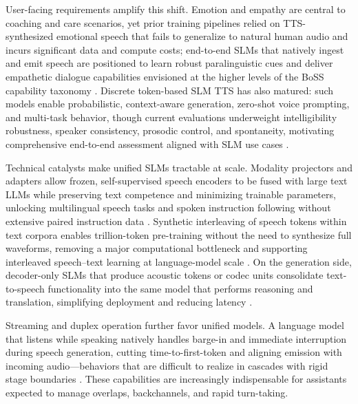User-facing requirements amplify this shift. Emotion and empathy are central to coaching and care scenarios, yet prior training pipelines relied on TTS-synthesized emotional speech that fails to generalize to natural human audio and incurs significant data and compute costs; end-to-end SLMs that natively ingest and emit speech are positioned to learn robust paralinguistic cues and deliver empathetic dialogue capabilities envisioned at the higher levels of the BoSS capability taxonomy . Discrete token-based SLM TTS has also matured: such models enable probabilistic, context-aware generation, zero-shot voice prompting, and multi-task behavior, though current evaluations underweight intelligibility robustness, speaker consistency, prosodic control, and spontaneity, motivating comprehensive end-to-end assessment aligned with SLM use cases \cite{wang2024evaluatingtextspeechsynthesislargediscre}.



Technical catalysts make unified SLMs tractable at scale. Modality projectors and adapters allow frozen, self-supervised speech encoders to be fused with large text LLMs while preserving text competence and minimizing trainable parameters, unlocking multilingual speech tasks and spoken instruction following without extensive paired instruction data \cite{wang2023slmbridgethingapbetweenspeechtextfoundat}. Synthetic interleaving of speech tokens within text corpora enables trillion-token pre-training without the need to synthesize full waveforms, removing a major computational bottleneck and supporting interleaved speech–text learning at language-model scale \cite{zeng2024scalingspeechtextpretrainingsyntheticint}. On the generation side, decoder-only SLMs that produce acoustic tokens or codec units consolidate text-to-speech functionality into the same model that performs reasoning and translation, simplifying deployment and reducing latency \cite{peng2024mslms2stmultitaskspeechlanguagemodeltext}.



Streaming and duplex operation further favor unified models. A language model that listens while speaking natively handles barge-in and immediate interruption during speech generation, cutting time-to-first-token and aligning emission with incoming audio—behaviors that are difficult to realize in cascades with rigid stage boundaries \cite{ma2024languagemodelcanlistenwhilespeaking}. These capabilities are increasingly indispensable for assistants expected to manage overlaps, backchannels, and rapid turn-taking.



